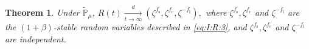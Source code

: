 \documentclass[12pt,a4paper]{amsart}
\theoremstyle{plain}
\newtheorem{thm}{Theorem}[section]
\theoremstyle{definition}
\numberwithin{equation}{section}
\begin{document}
\begin{thm}\label{thm: II}
Under $\mathbb{\widetilde{P}}_{\mu}$,
$
R(t) \xrightarrow[t\rightarrow\infty]{d}(\zeta^{f_\mathrm s},\zeta^{f_\mathrm c},\zeta^{-f_\mathrm l}),
$
where $\zeta^{f_\mathrm s},\zeta^{f_\mathrm c}$ and $\zeta^{-f_\mathrm l}$ are
the $(1+\beta)$-stable random variables described in \eqref{eq:I:R:3}, and $\zeta^{f_\mathrm s},\zeta^{f_\mathrm c}$ and $\zeta^{-f_\mathrm l}$ are independent.
\end{thm}
\end{document}
